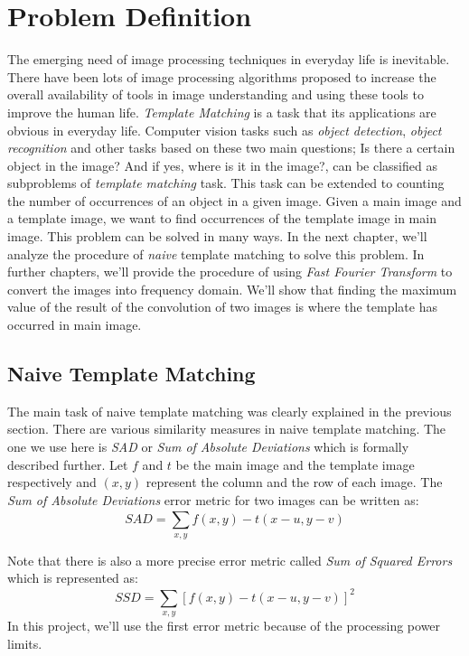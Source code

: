 \chapter{Problem Definition}

The emerging need of image processing techniques in everyday life is inevitable. There have been lots of image processing algorithms proposed to increase the overall availability of tools in image understanding and using these tools to improve the human life. \textit{Template Matching} is a task that its applications are obvious in everyday life. Computer vision tasks such as \textit{object detection}, \textit{object recognition} and other tasks based on these two main questions; Is there a certain object in the image? And if yes, where is it in the image?, can be classified as subproblems of \textit{template matching} task. This task can be extended to counting the number of occurrences of an object in a given image. Given a main image and a template image, we want to find occurrences of the template image in main image. This problem can be solved in many ways. In the next chapter, we'll analyze the procedure of \textit{naive} template matching to solve this problem. In further chapters, we'll provide the procedure of using \textit{Fast Fourier Transform} to convert the images into frequency domain. We'll show that finding the maximum value of the result of the convolution of two images is where the template has occurred in main image.

\section{Naive Template Matching}
The main task of naive template matching was clearly explained in the previous section. There are various similarity measures in naive template matching. The one we use here is \textit{SAD} or \textit{Sum of Absolute Deviations} which is formally described further. Let $f$ and $t$ be the main image and the template image respectively and $(x, y)$ represent the column and the row of each image. The \textit{Sum of Absolute Deviations} error metric for two images can be written as:
\begin{equation}
SAD = \sum_{x, y}^{}f(x, y) - t(x - u, y - v)
\end{equation}

Note that there is also a more precise error metric called \textit{Sum of Squared Errors} which is represented as:
\begin{equation}
SSD = \sum_{x, y}^{}[f(x, y) - t(x - u, y - v)]^2
\end{equation}
In this project, we'll use the first error metric because of the processing power limits.

